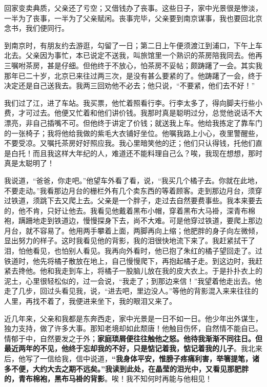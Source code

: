 \documentclass[UTF8,a4paper,8pt]{ctexart}
\begin{document}
 回家变卖典质，父亲还了亏空；又借钱办了丧事。这些日子，家中光景很是惨淡，一半为了丧事，一半为了父亲赋闲。丧事完毕，父亲要到南京谋事，我也要回北京念书，我们便同行。
 
 到南京时，有朋友约去游逛，勾留了一日；第二日上午便须渡江到浦口，下午上车北去。父亲因为事忙，本已说定不送我，叫旅馆里一个熟识的茶房陪我同去。他再三嘱咐茶房，甚是仔细。但他终于不放心，怕茶房不妥帖；颇踌躇了一会。其实我那年已二十岁，北京已来往过两三次，是没有甚么要紧的了。他踌躇了一会，终于决定还是自己送我去。我两三回劝他不必去；他只说，“不要紧，他们去不好！”
 
 我们过了江，进了车站。我买票，他忙着照看行李。行李太多了，得向脚夫行些小费，才可过去。他便又忙着和他们讲价钱。我那时真是聪明过分，总觉他说话不大漂亮，非自己插嘴不可。但他终于讲定了价钱；就送我上车。他给我拣定了靠车门的一张椅子；我将他给我做的紫毛大衣铺好坐位。他嘱我路上小心，夜里警醒些，不要受凉。又嘱托茶房好好照应我。我心里暗笑他的迂；他们只认得钱，托他们直是白托！而且我这样大年纪的人，难道还不能料理自己么？唉，我现在想想，那时真是太聪明了！
 
 我说道，“爸爸，你走吧。”他望车外看了看，说，“我买几个橘子去。你就在此地，不要走动。”我看那边月台的栅栏外有几个卖东西的等着顾客。走到那边月台，须穿过铁道，须跳下去又爬上去。父亲是一个胖子，走过去自然要费事些。我本来要去的，他不肯，只好让他去。我看见他戴着黑布小帽，穿着黑布大马褂，深青布棉袍，蹒跚地走到铁道边，慢慢探身下去，尚不大难。可是他穿过铁道，要爬上那边月台，就不容易了。他用两手攀着上面，两脚再向上缩；他肥胖的身子向左微倾，显出努力的样子。这时我看见他的背影，我的泪很快地流下来了。我赶紧拭干了泪，怕他看见，也怕别人看见。我再向外看时，他已抱了朱红的橘子望回走了。过铁道时，他先将橘子散放在地上，自己慢慢爬下，再抱起橘子走。到这边时，我赶紧去搀他。他和我走到车上，将橘子一股脑儿放在我的皮大衣上。于是扑扑衣上的泥土，心里很轻松似的，过一会说，“我走了；到那边来信！”我望着他走出去。他走了几步，回过头看见我，说，“进去吧，里边没人。”等他的背影混入来来往往的人里，再找不着了，我便进来坐下，我的眼泪又来了。
 
 近几年来，父亲和我都是东奔西走，家中光景是一日不如一日。他少年出外谋生，独力支持，做了许多大事。那知老境却如此颓唐！他触目伤怀，自然情不能自已。情郁于中，自然要发之于外；\textbf{家庭琐屑便往往触他之怒。他待我渐渐不同往日。但最近两年的不见，他终于忘却我的不好，只是惦记着我，惦记着我的儿子}。我北来后，他写了一信给我，信中说道，\textbf{“我身体平安，惟膀子疼痛利害，举箸提笔，诸多不便，大约大去之期不远矣。”我读到此处，在晶莹的泪光中，又看见那肥胖的，青布棉袍，黑布马褂的背影}。唉！我不知何时再能与他相见！
 
\end{document}
